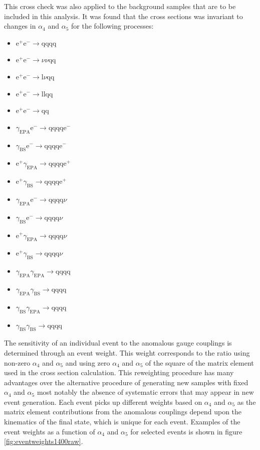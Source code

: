 This cross check was also applied to the background samples that are to be included in this analysis. It was found that the cross sections was invariant to changes in $\alpha_{4}$ and $\alpha_{5}$ for the following processes:

\begin{itemize}
\item $\text{e}^{+}\text{e}^{-} \rightarrow \text{qqqq}$
\item $\text{e}^{+}\text{e}^{-} \rightarrow \nu{\nu}\text{qq}$
\item $\text{e}^{+}\text{e}^{-} \rightarrow \text{l}\nu\text{qq}$
\item $\text{e}^{+}\text{e}^{-} \rightarrow \text{llqq}$
\item $\text{e}^{+}\text{e}^{-} \rightarrow \text{qq}$
\item $\gamma_{\text{EPA}}\text{e}^{-} \rightarrow \text{qqqq}\text{e}^{-}$
\item $\gamma_{\text{BS}}\text{e}^{-} \rightarrow \text{qqqq}\text{e}^{-}$
\item $\text{e}^{+}\gamma_{\text{EPA}} \rightarrow \text{qqqq}\text{e}^{+}$
\item $\text{e}^{+}\gamma_{\text{BS}} \rightarrow \text{qqqq}\text{e}^{+}$
\item $\gamma_{\text{EPA}}\text{e}^{-} \rightarrow \text{qqqq}\nu$
\item $\gamma_{\text{BS}}\text{e}^{-} \rightarrow \text{qqqq}\nu$
\item $\text{e}^{+}\gamma_{\text{EPA}} \rightarrow \text{qqqq}\nu$
\item $\text{e}^{+}\gamma_{\text{BS}} \rightarrow \text{qqqq}\nu$
\item $\gamma_{\text{EPA}}\gamma_{\text{EPA}} \rightarrow \text{qqqq}$
\item $\gamma_{\text{EPA}}\gamma_{\text{BS}} \rightarrow \text{qqqq}$
\item $\gamma_{\text{BS}}\gamma_{\text{EPA}} \rightarrow \text{qqqq}$ 
\item $\gamma_{\text{BS}}\gamma_{\text{BS}} \rightarrow \text{qqqq}$  
\end{itemize}

The sensitivity of an individual event to the anomalous gauge couplings is determined through an event weight. This weight corresponds to the ratio using non-zero $\alpha_{4}$ and $\alpha_{5}$ and using zero $\alpha_{4}$ and $\alpha_{5}$ of the square of the matrix element used in the cross section calculation. This reweighting procedure has many advantages over the alternative procedure of generating new samples with fixed $\alpha_{4}$ and $\alpha_{5}$ most notably the absence of systematic errors that may appear in new event generation. Each event picks up different weights based on $\alpha_{4}$ and $\alpha_{5}$ as the matrix element contributions from the anomalous couplings depend upon the kinematics of the final state, which is unique for each event. Examples of the event weights as a function of $\alpha_{4}$ and $\alpha_{5}$ for selected events is shown in figure \ref{fig:eventweights1400raw}.

